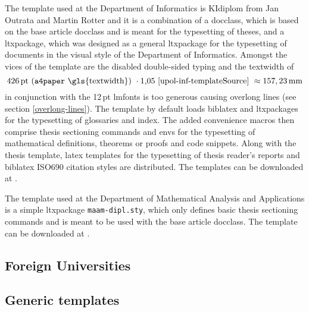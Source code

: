    The template used at the Department of Informatics is KIdiplom from Jan Outrata and Martin Rotter and it is a combination of a \gls{docclass}, which is based on the base article \gls{docclass} and is meant for the typesetting of theses, and a \gls{ltxpackage}, which was designed as a general \gls{ltxpackage} for the typesetting of documents in the visual style of the Department of Informatics. Amongst the vices of the template are the disabled double-sided typing \cite[lines~69--72]{upol-inf-templateSource} and the \gls{textwidth} of\begin{equation}
  426\text{\,pt}\text{ (\texttt{a4paper} \gls{textwidth}) }\cdot1{,}05\text{ \cite[line~81]{upol-inf-templateSource} }\approx157,23\text{\,mm}
\end{equation} in conjunction with the 12\,pt \gls{lmfonts} is too generous \cite[lines~74--82]{upol-inf-templateSource} causing overlong lines (see section \ref{overlong-lines}). The template by default loads \gls{biblatex} and \glspl{ltxpackage} for the typesetting of glossaries and index. The added convenience macros then comprise thesis sectioning commands and \glspl{env} for the typesetting of mathematical definitions, theorems or proofs and code snippets. Along with the thesis template, \gls{latex} templates for the typesetting of thesis reader's reports and \gls{biblatex} ISO\hyph{}690 \cite{iso690-1,iso690-2} citation styles\pending{} are distributed. The templates can be downloaded at \cite{upol-inf-template}.
  
The template used at the Department of Mathematical Analysis and Applications is a simple \gls{ltxpackage} \texttt{maam-dipl.sty}, which only defines basic thesis sectioning commands and is meant to be used with the base article \gls{docclass}. The template can be downloaded at \cite{upol-maam-template}.

\subsection{Foreign Universities}
\subsection{Generic templates}
